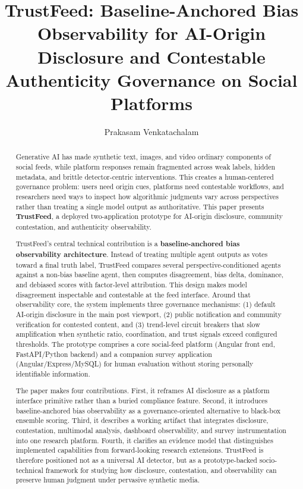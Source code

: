 \documentclass[acmlarge,screen,nonacm]{acmart}
\begin{document}
\title[TrustFeed]{TrustFeed: Baseline-Anchored Bias Observability for AI-Origin Disclosure and Contestable Authenticity Governance on Social Platforms}

\author{Prakasam Venkatachalam}

\renewcommand{\shortauthors}{Venkatachalam}

\begin{abstract}
Generative AI has made synthetic text, images, and video ordinary components of social feeds, while platform responses remain fragmented across weak labels, hidden metadata, and brittle detector-centric interventions. This creates a human-centered governance problem: users need origin cues, platforms need contestable workflows, and researchers need ways to inspect how algorithmic judgments vary across perspectives rather than treating a single model output as authoritative. This paper presents \textbf{TrustFeed}, a deployed two-application prototype for AI-origin disclosure, community contestation, and authenticity observability.

TrustFeed's central technical contribution is a \textbf{baseline-anchored bias observability architecture}. Instead of treating multiple agent outputs as votes toward a final truth label, TrustFeed compares several perspective-conditioned agents against a non-bias baseline agent, then computes disagreement, bias delta, dominance, and debiased scores with factor-level attribution. This design makes model disagreement inspectable and contestable at the feed interface. Around that observability core, the system implements three governance mechanisms: (1) default AI-origin disclosure in the main post viewport, (2) public notification and community verification for contested content, and (3) trend-level circuit breakers that slow amplification when synthetic ratio, coordination, and trust signals exceed configured thresholds. The prototype comprises a core social-feed platform (Angular front end, FastAPI/Python backend) and a companion survey application (Angular/Express/MySQL) for human evaluation without storing personally identifiable information.

The paper makes four contributions. First, it reframes AI disclosure as a platform interface primitive rather than a buried compliance feature. Second, it introduces baseline-anchored bias observability as a governance-oriented alternative to black-box ensemble scoring. Third, it describes a working artifact that integrates disclosure, contestation, multimodal analysis, dashboard observability, and survey instrumentation into one research platform. Fourth, it clarifies an evidence model that distinguishes implemented capabilities from forward-looking research extensions. TrustFeed is therefore positioned not as a universal AI detector, but as a prototype-backed socio-technical framework for studying how disclosure, contestation, and observability can preserve human judgment under pervasive synthetic media.
\end{abstract}
\end{document}
